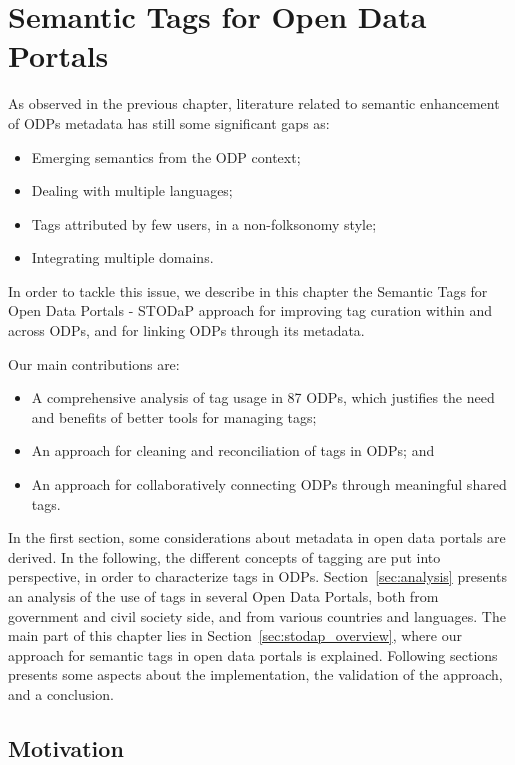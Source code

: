 \chapter{Semantic Tags for Open Data Portals}
\label{chap:tagging}


As observed in the previous chapter, literature related to semantic enhancement of ODPs metadata has still some significant gaps as:
\begin{itemize}
	\item Emerging semantics from the ODP context;
	\item Dealing with multiple languages;
	\item Tags attributed by few users, in a non-folksonomy style;
	\item Integrating multiple domains.
\end{itemize}

In order to	tackle this issue, we describe in this chapter the Semantic Tags for Open Data Portals - STODaP approach for improving tag curation within and across ODPs, and for linking ODPs through its metadata.

Our main contributions are:
\begin{itemize}
	\item A comprehensive analysis of tag usage in 87 ODPs, which justifies the need and benefits of better tools for managing tags;
	\item An approach for cleaning and reconciliation of tags in ODPs; and
	\item An approach for collaboratively connecting ODPs through meaningful shared tags.
\end{itemize}

In the first section, some considerations about metadata in open data portals are derived. 
In the following, the different concepts of tagging are put into perspective, in order to characterize tags in ODPs. 
Section~\ref{sec:analysis} presents an analysis of the use of tags in several Open Data Portals, both from government and civil society side, and from various countries and languages.
The main part of this chapter lies in Section~\ref{sec:stodap_overview}, where our approach for semantic tags in open data portals is explained. 
Following sections presents some aspects about the implementation, the validation of the approach, and a conclusion.

\section{Motivation}

